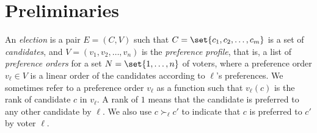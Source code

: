 \documentclass[letterpaper]{article} %
\newcommand{\Bribery}{\textsc{Bribery}}
\newcommand{\swapB}{\textsc{Swap Bribery}}
\newcommand{\shiftB}{\textsc{Shift Bribery}}
\begin{document}





\section{Preliminaries}
An \emph{election} is a pair $E=(C, V)$ such that $C=\set{c_1, c_2, \ldots, c_m}$ is a set of \emph{candidates}, and  $V = \left(v_1, v_2, \ldots, v_n\right)$ is the \emph{preference profile}, that is, a list of \emph{preference orders} for a set $N=\set{1,\ldots,n}$ of voters, where a preference order $v_\ell \in V$ is a linear order of the candidates according to $\ell$'s preferences.
 We sometimes refer to a preference order $v_\ell$ as a function such that $v_\ell(c)$ is the rank of candidate $c$ in $v_\ell$. A rank of $1$ means that the candidate is preferred to any other candidate by $\ell$. We also use $c \succ_\ell c'$ to indicate that $c$ is preferred to $c'$ by voter $\ell$.
\end{document}
